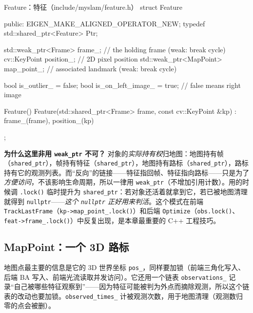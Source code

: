 \begin{codebox}[C++]{Feature：特征（include/myslam/feature.h）}
struct Feature {
   public:
    EIGEN_MAKE_ALIGNED_OPERATOR_NEW;
    typedef std::shared_ptr<Feature> Ptr;

    std::weak_ptr<Frame> frame_;          // the holding frame (weak: break cycle)
    cv::KeyPoint position_;               // 2D pixel position
    std::weak_ptr<MapPoint> map_point_;   // associated landmark (weak: break cycle)

    bool is_outlier_ = false;
    bool is_on_left_image_ = true;        // false means right image

    Feature() {}
    Feature(std::shared_ptr<Frame> frame, const cv::KeyPoint &kp)
        : frame_(frame), position_(kp) {}
};
\end{codebox}

\begin{insight}
\textbf{为什么这里非用 \texttt{weak\_ptr} 不可？}
对象的\emph{实际持有权}归地图：地图持有帧（\texttt{shared\_ptr}），帧持有特征（\texttt{shared\_ptr}），地图持有路标（\texttt{shared\_ptr}），路标持有它的观测列表。而“反向”的链接——特征指回帧、特征指向路标——只是为了\emph{方便访问}，不该影响生命周期，所以一律用 \texttt{weak\_ptr}（不增加引用计数）。用的时候调 \texttt{.lock()} 临时提升为 \texttt{shared\_ptr}：若对象还活着就拿到它，若已被地图清理就得到 \texttt{nullptr}——\emph{这个 \texttt{nullptr} 正好用来判活}。这个模式在前端 \texttt{TrackLastFrame}（\verb|kp->map_point_.lock()|）和后端 \texttt{Optimize}（\verb|obs.lock()|、\verb|feat->frame_.lock()|）中反复出现，是本章最重要的 C++ 工程技巧。
\end{insight}

\subsection{MapPoint：一个 3D 路标}
\label{sec:sys-mappoint}

地图点最主要的信息是它的 3D 世界坐标 \texttt{pos\_}，同样要加锁（前端三角化写入、后端 BA 写入、前端光流读取并发访问）。它还用一个链表 \texttt{observations\_} 记录“自己被哪些特征观察到”——因为特征可能被判为外点而摘除观测，所以这个链表的改动也要加锁。\texttt{observed\_times\_} 计被观测次数，用于地图清理（观测数归零的点会被删）。

